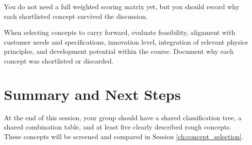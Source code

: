 You do not need a full weighted scoring matrix yet, but you should record why each shortlisted concept survived the discussion.

\begin{tcolorbox}[title=Checkpoint]
When selecting concepts to carry forward, evaluate feasibility, alignment with customer needs and specifications, innovation level, integration of relevant physics principles, and development potential within the course. Document why each concept was shortlisted or discarded.
\end{tcolorbox}

\section{Summary and Next Steps}

At the end of this session, your group should have a shared classification tree, a shared combination table, and at least five clearly described rough concepts. These concepts will be screened and compared in Session \ref{ch:concept_selection}.
